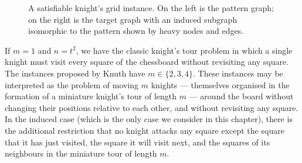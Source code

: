 \begin{figure}[htb]
    \centering
    \caption{A satisfiable knight's grid instance. On the left is the pattern graph; on the right
            is the target graph with an induced subgraph isomorphic to the pattern shown by heavy
            nodes and edges.}\label{figure:knights-example}
\end{figure}

If $m=1$ and $n=t^2$, we have the classic knight's tour problem in which a single knight
must visit every square of the chessboard without revisiting any square.  The instances proposed
by Knuth have $m \in \{2,3,4\}$.  These instances may be interpreted as the problem of moving $m$
knights --- themselves organised in the formation of a miniature knight's tour of length $m$ ---
around the board without changing their positions relative to each other, and without revisiting
any square.  In the induced case (which is the only case we consider in this chapter), there
is the additional restriction that no knight attacks any square except the square that it has
just visited, the square it will visit next, and the squares of its neighbours in the miniature
tour of length $m$.

